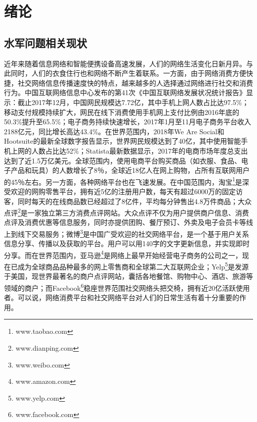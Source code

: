
\chapter{绪论}
\label{chap:intro}

\section{水军问题相关现状}

近年来随着信息网络和智能便携设备高速发展，人们的网络生活变化日新月异。与此同时，人们的衣食住行也和网络不断产生着联系。一方面，由于网络消费方便快捷，社交网络信息传播速度快的特点，越来越多的人选择通过网络进行社交和消费行为。中国互联网络信息中心发布的第41次《中国互联网络发展状况统计报告》显示：截止2017年12月，中国网民规模达7.72亿，其中手机上网人数占比达97.5\%；移动支付规模持续扩大，网民在线下消费使用手机网上支付比例由2016年底的50.3\%提升至65.5\%；电子商务持续快速增长，2017年1月至11月电子商务平台收入2188亿元，同比增长高达43.4\%。在世界范围内，2018年We Are Social和Hootsuite的最新全球数字报告显示，世界网民规模达到了40亿，其中使用智能手机上网的人数占比达52\%；Statista最新数据显示，2017年的电商市场年度总支出达到了近1.5万亿美元。全球范围内，使用电商平台购买商品（如衣服、食品、电子产品和玩具）的人数增长了8％，全球近18亿人在网上购物，占所有互联网用户的45％左右。另一方面，各种网络平台也在飞速发展。在中国范围内，淘宝\footnote{www.taobao.com}是深受欢迎的网购零售平台，拥有近5亿的注册用户数，每天有超过6000万的固定访客，同时每天的在线商品数已经超过了8亿件，平均每分钟售出4.8万件商品；大众点评\footnote{www.dianping.com}是一家独立第三方消费点评网站。大众点评不仅为用户提供商户信息、消费点评及消费优惠等信息服务，同时亦提供团购、餐厅预订、外卖及电子会员卡等线上到线下交易服务；微博\footnote{www.weibo.com}是中国广受欢迎的社交网络平台，是一个基于用户关系信息分享、传播以及获取的平台。用户可以用140字的文字更新信息，并实现即时分享。而在世界范围内，亚马逊\footnote{www.amazon.com}是网络上最早开始经营电子商务的公司之一，现在已成为全球商品品种最多的网上零售商和全球第二大互联网企业；Yelp\footnote{www.yelp.com}是发源于美国，现世界最著名的商户点评网站，囊括各地餐馆、购物中心、酒店、旅游等领域的商户；而Facebook\footnote{www.facebook.com}稳座世界范围社交网络头把交椅，拥有近20亿活跃使用者。可以说，网络消费平台和社交网络平台对人们的日常生活有着十分重要的作用。

